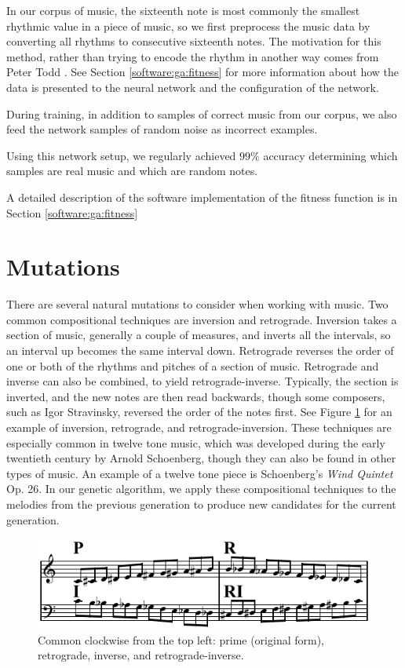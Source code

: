 In our corpus of music, the sixteenth note is most commonly the smallest rhythmic value in a piece of music, so we first preprocess the music data by converting all rhythms to consecutive sixteenth notes.
The motivation for this method, rather than trying to encode the rhythm in another way comes from Peter Todd \cite{todd_connectionist_1989}.
See Section \ref{software:ga:fitness} for more information about how the data is presented to the neural network and the configuration of the network.

During training, in addition to samples of correct music from our corpus, we also feed the network samples of random noise as incorrect examples.

Using this network setup, we regularly achieved $99\%$ accuracy determining which samples are real music and which are random notes.

A detailed description of the software implementation of the fitness function is in Section \ref{software:ga:fitness}

\section{Mutations} \label{ga:mutate}

There are several natural mutations to consider when working with music.
Two common compositional techniques are inversion and retrograde.
Inversion takes a section of music, generally a couple of measures, and inverts all the intervals, so an interval up becomes the same interval down.
Retrograde reverses the order of one or both of the rhythms and pitches of a section of music.
Retrograde and inverse can also be combined, to yield retrograde-inverse.
Typically, the section is inverted, and the new notes are then read backwards, though some composers, such as Igor Stravinsky, reversed the order of the notes first.
See Figure \ref{fig:p-r-i-ri} for an example of inversion, retrograde, and retrograde-inversion.
These techniques are especially common in twelve tone music, which was developed during the early twentieth century by Arnold Schoenberg, though they can also be found in other types of music.
An example of a twelve tone piece is Schoenberg's \textit{Wind Quintet} Op. 26.
In our genetic algorithm, we apply these compositional techniques to the melodies from the previous generation to produce new candidates for the current generation.

\begin{figure}
	\centering
	\includegraphics[width=\linewidth]{figures/P-R-I-RI.png} %
	\caption{Common  clockwise from the top left: prime (original form), retrograde, inverse, and retrograde-inverse.}
	\label{fig:p-r-i-ri}
\end{figure}

